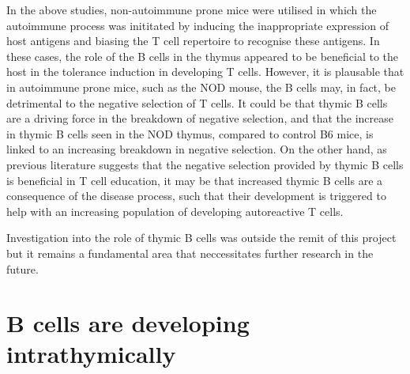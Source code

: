 In the above studies, non-autoimmune prone mice were utilised in which the autoimmune process was inititated by inducing the inappropriate expression of host antigens and biasing the T cell repertoire to recognise these antigens.
In these cases, the role of the B cells in the thymus appeared to be beneficial to the host in the tolerance induction in developing T cells.
However, it is plausable that in autoimmune prone mice, such as the NOD mouse, the B cells may, in fact, be detrimental to the negative selection of T cells.
It could be that thymic B cells are a driving force in the breakdown of negative selection, and that the increase in thymic B cells seen in the NOD thymus, compared to control B6 mice, is linked to an increasing breakdown in negative selection.
On the other hand, as previous literature suggests that the negative selection provided by thymic B cells is beneficial in T cell education, it may be that increased thymic B cells are a consequence of the disease process, such that their development is triggered to help with an increasing population of developing autoreactive T cells.

Investigation into the role of thymic B cells was outside the remit of this project but it remains a fundamental area that neccessitates further research in the future.



\section{B cells are developing intrathymically}

